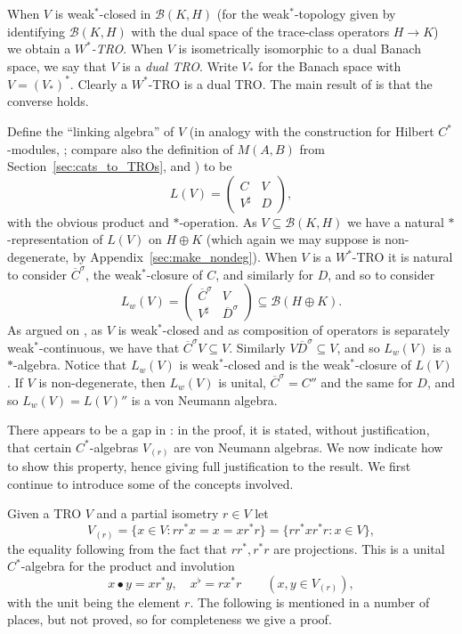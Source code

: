 \documentclass[a4paper,11pt]{article}
\theoremstyle{plain}
\theoremstyle{remark}
\newcommand{\mc}[1]{\mathcal{#1}}
\begin{document}
When $V$ is weak$^*$-closed in $\mc B(K,H)$ (for the weak$^*$-topology given by identifying $\mc B(K,H)$ with the dual space of the trace-class operators $H\to K$) we obtain a \emph{$W^*$-TRO}.  When $V$ is isometrically isomorphic to a dual Banach space, we say that $V$ is a \emph{dual TRO}.  Write $V_*$ for the Banach space with $V = (V_*)^*$.  Clearly a $W^*$-TRO is a dual TRO.  The main result of \cite[Section~2]{EOR_InjectivityNuclearityOS} is that the converse holds.

Define the ``linking algebra'' of $V$ (in analogy with the construction for Hilbert $C^*$-modules, \cite[Chapter~2]{RaeburnWilliams_MoritaEquivBook}; compare also the definition of $M(A,B)$ from Section~\ref{sec:cats_to_TROs}, and \cite[Section~2]{EOR_InjectivityNuclearityOS}) to be
\[ L(V) = \begin{pmatrix} C & V \\ V^\sharp & D \end{pmatrix}, \]
with the obvious product and $*$-operation.  As $V\subseteq\mc B(K,H)$ we have a natural $*$-representation of $L(V)$ on $H\oplus K$ (which again we may suppose is non-degenerate, by Appendix~\ref{sec:make_nondeg}).  When $V$ is a $W^*$-TRO it is natural to consider $\overline{C}^\sigma$, the weak$^*$-closure of $C$, and similarly for $D$, and so to consider
\[ L_w(V) = \begin{pmatrix} \overline{C}^\sigma & V \\ V^\sharp & \overline{D}^\sigma \end{pmatrix} \subseteq \mc B(H\oplus K). \]
As argued on \cite[pages~493--494]{EOR_InjectivityNuclearityOS}, as $V$ is weak$^*$-closed and as composition of operators is separately weak$^*$-continuous, we have that $\overline{C}^\sigma V \subseteq V$.  Similarly $V \overline{D}^\sigma \subseteq V$, and so $L_w(V)$ is a $*$-algebra.  Notice that $L_w(V)$ is weak$^*$-closed and is the weak$^*$-closure of $L(V)$.  If $V$ is non-degenerate, then $L_w(V)$ is unital, $\overline{C}^\sigma = C''$ and the same for $D$, and so $L_w(V) = L(V)''$ is a von Neumann algebra.

There appears to be a gap in \cite[Proposition~2.4]{EOR_InjectivityNuclearityOS}: in the proof, it is stated, without justification, that certain $C^*$-algebras $V_{(r)}$ are von Neumann algebras.  We now indicate how to show this property, hence giving full justification to the result.  We first continue to introduce some of the concepts involved.

Given a TRO $V$ and a partial isometry $r\in V$ let
\[ V_{(r)} = \{ x\in V : rr^* x = x = x r^*r \} = \{ rr^* x r^*r : x\in V \}, \]
the equality following from the fact that $rr^*, r^*r$ are projections.  This is a unital $C^*$-algebra for the product and involution
\[ x \bullet y = xr^*y, \quad x^\flat = rx^*r \qquad (x,y\in V_{(r)}), \]
with the unit being the element $r$.  The following is mentioned in a number of places, but not proved, so for completeness we give a proof.
\end{document}
